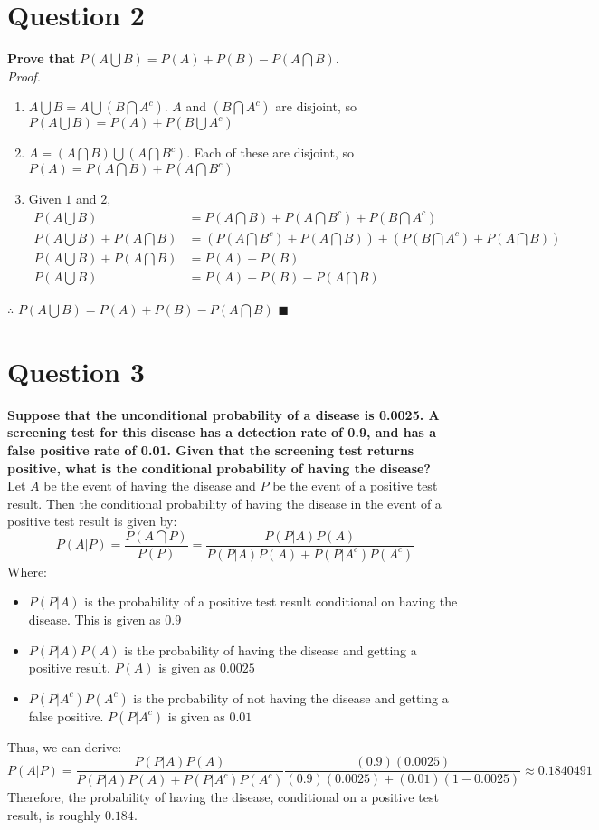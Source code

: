 \documentclass{article}
\newcommand{\union}{\bigcup}
\newcommand{\intersect}{\bigcap}
\begin{document}
\section*{Question 2}
\textbf{Prove that} $P(A\union B)=P(A)+P(B)-P(A\intersect B)$\textbf{.}
\medskip \\
\textit{Proof.}
\begin{enumerate}
	\item $A\union B=A\union(B\intersect A^c)$. $A$ and $(B\intersect A^c)$ are disjoint, so $P(A\union B)=P(A) + P(B\union A^c)$
	\item $A=(A\intersect B)\union(A\intersect B^c)$. Each of these are disjoint, so $P(A)=P(A\intersect B) + P(A\intersect B^c)$
	\item Given $1$ and $2$, 
		\begin{align*}
			P(A\union B)						&= P(A\intersect B)+P(A\intersect B^c)+P(B\intersect A^c)								\\
			P(A\union B) + P(A\intersect B)		&= (P(A\intersect B^c) + P(A\intersect B)) + (P(B\intersect A^c) + P(A\intersect B))	\\
			P(A\union B) + P(A\intersect B)		&= P(A) + P(B)																			\\
			P(A\union B)						&= P(A) + P(B) - P(A\intersect B)
		\end{align*}
\end{enumerate}
$\therefore$ $P(A\union B)= P(A) + P(B) - P(A\intersect B)$ $\blacksquare$


\section*{Question 3}
\textbf{Suppose that the unconditional probability of a disease is 0.0025. A screening test for this disease has a detection rate of 0.9, and has a false positive rate of 0.01. Given that the screening test returns positive, what is the conditional probability of having the disease?}
\medskip \\
Let $A$ be the event of having the disease and $P$ be the event of a positive test result. Then the conditional probability of having the disease in the event of a positive test result is given by:
\[
	P(A|P) = \frac{P(A\intersect P)}{P(P)} = \frac{P(P|A)P(A)}{P(P|A)P(A) + P(P|A^c)P(A^c)}
\]
Where:
\begin{itemize}
	\item $P(P|A)$ is the probability of a positive test result conditional on having the disease. This is given as $0.9$
	\item $P(P|A)P(A)$ is the probability of having the disease and getting a positive result. $P(A)$ is given as $0.0025$
	\item $P(P|A^c)P(A^c)$ is the probability of not having the disease and getting a false positive. $P(P|A^c)$ is given as $0.01$
\end{itemize}
Thus, we can derive:
\[
	P(A|P) = \frac{P(P|A)P(A)}{P(P|A)P(A) + P(P|A^c)P(A^c)}\frac{(0.9)(0.0025)}{(0.9)(0.0025) + (0.01)(1-0.0025)}\approx0.1840491
\]
Therefore, the probability of having the disease, conditional on a positive test result, is roughly $0.184$.
\end{document}
